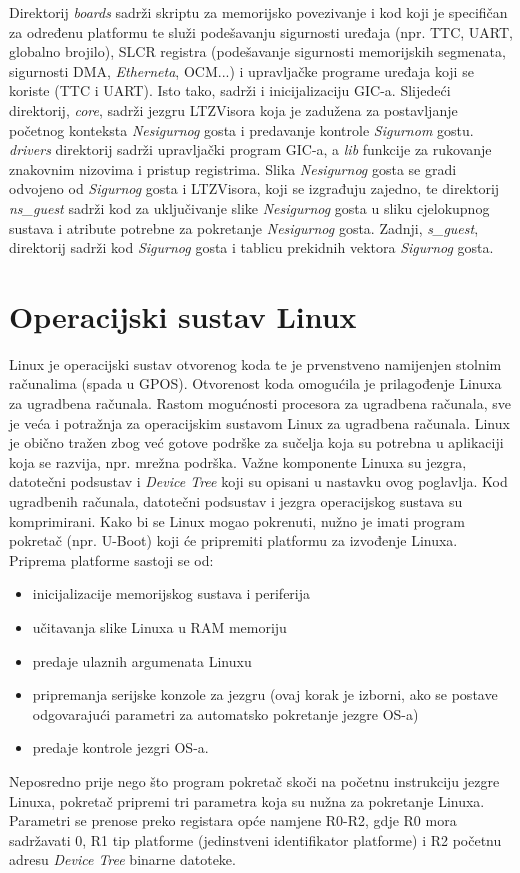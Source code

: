 \documentclass[times, utf8, diplomski, numeric]{fer}
\begin{document}
Direktorij \textit{boards} sadrži skriptu za memorijsko povezivanje i kod koji je specifičan za određenu platformu te služi
podešavanju sigurnosti uređaja (npr. TTC, UART, globalno brojilo), SLCR registra (podešavanje sigurnosti memorijskih
segmenata, sigurnosti DMA, \textit{Etherneta}, OCM...) i upravljačke programe uređaja koji se koriste (TTC i UART). Isto tako,
sadrži i inicijalizaciju GIC-a. Slijedeći direktorij, \textit{core}, sadrži jezgru LTZVisora koja je zadužena za postavljanje
početnog konteksta \textit{Nesigurnog} gosta i predavanje kontrole \textit{Sigurnom} gostu. \textit{drivers} direktorij sadrži upravljački
program GIC-a, a \textit{lib} funkcije za rukovanje znakovnim nizovima i pristup registrima. Slika \textit{Nesigurnog} gosta se gradi
odvojeno od \textit{Sigurnog} gosta i LTZVisora, koji se izgrađuju zajedno, te direktorij \textit{ns\_guest} sadrži kod za uključivanje
slike \textit{Nesigurnog} gosta u sliku cjelokupnog sustava i atribute potrebne za pokretanje \textit{Nesigurnog} gosta. Zadnji,
\textit{s\_guest}, direktorij sadrži kod \textit{Sigurnog} gosta i tablicu prekidnih vektora \textit{Sigurnog} gosta.

\chapter{Operacijski sustav Linux}
Linux je operacijski sustav otvorenog koda te je prvenstveno namijenjen stolnim računalima (spada u GPOS).
Otvorenost koda omogućila je prilagođenje Linuxa za ugradbena računala.
Rastom mogućnosti procesora za ugradbena računala, sve je veća i potražnja za operacijskim sustavom Linux za ugradbena
računala. Linux je obično tražen zbog već gotove podrške za sučelja koja su potrebna u aplikaciji koja se razvija, npr.
mrežna podrška. Važne komponente Linuxa su jezgra, datotečni podsustav i \textit{Device Tree} koji su opisani u nastavku
ovog poglavlja. Kod ugradbenih računala, datotečni podsustav i jezgra operacijskog sustava su komprimirani.
Kako bi se Linux mogao pokrenuti, nužno je imati program pokretač (npr. U-Boot) koji će pripremiti platformu za izvođenje
Linuxa. Priprema platforme sastoji se od:
\begin{itemize}
  \item{inicijalizacije memorijskog sustava i periferija}
  \item{učitavanja slike Linuxa u RAM memoriju}
  \item{predaje ulaznih argumenata Linuxu}
  \item{pripremanja serijske konzole za jezgru (ovaj korak je izborni, ako se postave odgovarajući parametri za automatsko
  pokretanje jezgre OS-a)}
  \item{predaje kontrole jezgri OS-a.}
\end{itemize}
Neposredno prije nego što program pokretač skoči na početnu instrukciju jezgre Linuxa, pokretač
pripremi tri parametra koja su nužna za pokretanje Linuxa. Parametri se prenose preko registara opće namjene R0-R2, gdje
R0 mora sadržavati 0, R1 tip platforme (jedinstveni identifikator platforme) i R2 početnu adresu \textit{Device Tree} binarne
datoteke.
\end{document}
